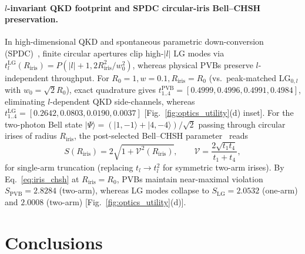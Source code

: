 \documentclass[aps,pra,reprint,amsmath,amssymb,floatfix,longbibliography]{revtex4-2}
\providecommand{\ket}[1]{\lvert#1\rangle}
\providecommand{\abs}[1]{\lvert#1\rvert}
\begin{document}
\paragraph*{$l$-invariant QKD footprint and SPDC circular-iris Bell--CHSH preservation.}
In high-dimensional QKD and spontaneous parametric down-conversion (SPDC)~\cite{Cerf2002,LawEberly2004,Walborn2010,Mirhosseini2015}, finite circular apertures clip high-$\abs{l}$ LG modes via $t_l^{\mathrm{LG}}(R_{\mathrm{iris}}) = P(\abs{l}+1, 2R_{\mathrm{iris}}^2/w_0^2)$, whereas physical PVBs preserve $l$-independent throughput. For $R_0 = 1, w = 0.1, R_{\mathrm{iris}} = R_0$ (vs.\ peak-matched $\mathrm{LG}_{0,l}$ with $w_0 = \sqrt{2}R_0$), exact quadrature gives $t_{1..4}^{\mathrm{PVB}} = [0.4999, 0.4996, 0.4991, 0.4984]$, eliminating $l$-dependent QKD side-channels, whereas $t_{1..4}^{\mathrm{LG}} = [0.2642, 0.0803, 0.0190, 0.0037]$ [Fig.~\ref{fig:optics_utility}(d) inset]. For the two-photon Bell state $\ket{\Psi} = (\ket{1,-1} + \ket{4,-4})/\sqrt{2}$ passing through circular irises of radius $R_{\mathrm{iris}}$, the post-selected Bell--CHSH parameter~\cite{Clauser1969} reads
\begin{equation}
S(R_{\mathrm{iris}}) = 2\sqrt{1 + \mathcal{V}^2(R_{\mathrm{iris}})}, \qquad \mathcal{V} = \frac{2\sqrt{t_1 t_4}}{t_1 + t_4},
\label{eq:iris_chsh}
\end{equation}
for single-arm truncation (replacing $t_l \to t_l^2$ for symmetric two-arm irises). By Eq.~\eqref{eq:iris_chsh} at $R_{\mathrm{iris}} = R_0$, PVBs maintain near-maximal violation $S_{\mathrm{PVB}} = 2.8284$ (two-arm), whereas LG modes collapse to $S_{\mathrm{LG}} = 2.0532$ (one-arm) and $2.0008$ (two-arm) [Fig.~\ref{fig:optics_utility}(d)].

\section{Conclusions}
\label{sec:conclusions}
\end{document}
